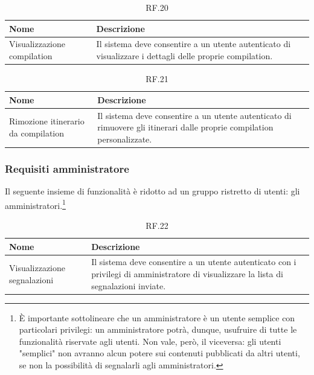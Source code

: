 \documentclass{natourDoc}
\begin{document}
\begin{table}[H]
	\centering
	\begin{tabular}{ |p{5cm}|p{10.3cm}| }
		\hline
		\rowcolor{PineGreen!70}
		\textbf{Nome}               & \textbf{Descrizione}                                                          \\
		\hline
		Visualizzazione compilation & Il sistema deve consentire a un utente autenticato di visualizzare i dettagli
		delle proprie compilation.                                                                                  \\
		\hline
	\end{tabular}
	\caption{RF.20}

\end{table}


\begin{table}[H]
	\centering
	\begin{tabular}{ |p{5cm}|p{10.3cm}| }
		\hline
		\rowcolor{PineGreen!70}
		\textbf{Nome}                       & \textbf{Descrizione}                                                          \\
		\hline
		Rimozione itinerario da compilation & Il sistema deve consentire a un utente autenticato di rimuovere gli itinerari
		dalle proprie compilation personalizzate.                                                                           \\
		\hline
	\end{tabular}
	\caption{RF.21}

\end{table}

\subsubsection{Requisiti amministratore}
Il seguente insieme di funzionalità è ridotto ad un gruppo ristretto di utenti: gli amministratori.\footnote{È importante sottolineare che un amministratore è un utente semplice con particolari privilegi: 
un amministratore potrà, dunque, usufruire di tutte le funzionalità riservate agli 
utenti. Non vale, però, il viceversa: gli utenti "semplici" non avranno alcun potere 
sui contenuti pubblicati da altri utenti, se non la possibilità di segnalarli agli 
amministratori.}

\begin{table}[H]
	\centering
	\begin{tabular}{ |p{5cm}|p{10.3cm}| }
		\hline
		\rowcolor{PineGreen!70}
		\textbf{Nome}                & \textbf{Descrizione}                                                                                \\
		\hline
		Visualizzazione segnalazioni & Il sistema deve consentire a un utente autenticato con i privilegi di amministratore di visualizzare
		la lista di segnalazioni inviate.                                                                                                  \\
		\hline
	\end{tabular}
	\caption{RF.22}

\end{table}
\end{document}
